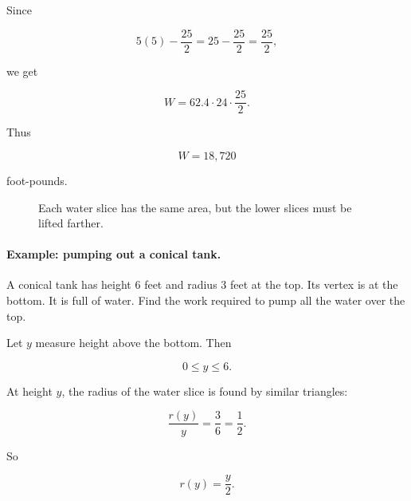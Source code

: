 Since

\[
5(5)-\frac{25}{2}
=
25-\frac{25}{2}
=
\frac{25}{2},
\]

we get

\[
W=62.4\cdot24\cdot\frac{25}{2}.
\]

Thus

\[
W=\boxed{18{,}720}
\]

foot-pounds.

\begin{figure}[h]
\centering
{}
\caption{Each water slice has the same area, but the lower slices must be lifted farther.}
\label{fig:pumping-rectangular-tank}
\end{figure}

\paragraph{Example: pumping out a conical tank.}
A conical tank has height \(6\) feet and radius \(3\) feet at the top.  Its vertex is at
the bottom.  It is full of water.  Find the work required to pump all the water over the
top.

Let \(y\) measure height above the bottom.  Then

\[
0\le y\le6.
\]

At height \(y\), the radius of the water slice is found by similar triangles:

\[
\frac{r(y)}{y}=\frac{3}{6}=\frac12.
\]

So

\[
r(y)=\frac{y}{2}.
\]

